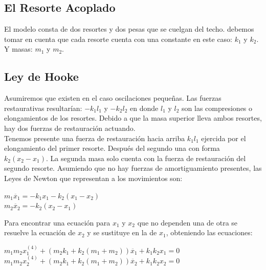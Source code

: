 \documentclass{article}
\begin{document}
\subsection{El Resorte Acoplado}
El modelo consta de dos resortes y dos pesas que se cuelgan del techo. debemos tomar en cuenta que cada resorte cuenta con una constante en este caso: $k_{1}$ y $k_{2}$. Y masas: $m_{1}$ y $m_{2}$.
\subsection{Ley de Hooke}
Asumiremos que existen en el caso oscilaciones pequeñas. Las fuerzas restaurativas resultarían: $-k_{1}l_{1}$ y $-k_{2}l_{2}$ en donde $l_{1}$ y $l_{2}$ son las compresiones o elongamientos de los resortes. Debido a que la masa superior lleva ambos resortes, hay dos fuerzas de restauración actuando.\\
Tenemos presente una fuerza de restauración hacia arriba $k_{1}l_{1}$ ejercida por el elongamiento del primer resorte. Después del segundo una con forma $k_{2}(x_{2}-x_{1})$. La segunda masa solo cuenta con la fuerza de restauración del segundo resorte. Asumiendo que no hay fuerzas de amortiguamiento presentes, las Leyes de Newton que representan a los movimientos son:\\
\begin{center}
$m_{1}\ddot{x_{1}}=-k_{1}x_{1}-k_{2}(x_{1}-x_{2})$\\
$m_{2}\ddot{x_{2}}=-k_{2}(x_2-x_1)$\\
\end{center}
Para encontrar una ecuación para $x_{1}$ y $x_{2}$ que no dependen una de otra se resuelve la ecuación de $x_{2}$ y se sustituye en la de $x_{1}$, obteniendo las ecuaciones:\\
\begin{center}
$m_{1}m_{2}x_{1}^{(4)}+(m_{2}k_{1}+k_{2}(m_{1}+m_{2}))\ddot{x_{1}}+k_{1}k_{2}x_{1}=0$\\
$m_{1}m_{2}x_{2}^{(4)}+(m_{2}k_{1}+k_{2}(m_{1}+m_{2}))\ddot{x_{2}}+k_{1}k_{2}x_{2}=0$

\end{center}
\end{document}
